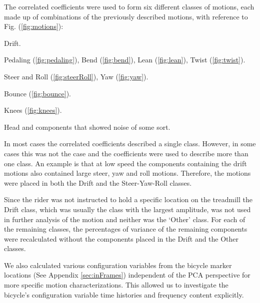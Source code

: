 The correlated coefficients were used to form six different classes of motions,
each made up of combinations of the previously described motions, with
reference to Fig. (\ref{fig:motions}):
\begin{description}
    \item[Drift] Drift.
    \item[Pedaling] Pedaling (\ref{fig:pedaling}), Bend (\ref{fig:bend}), Lean
        (\ref{fig:lean}), Twist (\ref{fig:twist}).
    \item[Steer-Yaw-Roll] Steer and Roll (\ref{fig:steerRoll}), Yaw
        (\ref{fig:yaw}).
    \item[Bounce] Bounce (\ref{fig:bounce}).
    \item[Knees] Knees (\ref{fig:knees}).
    \item[Others] Head and components that showed noise of some
    sort.
\end{description}
In most cases the correlated coefficients described a single class. However, in
some cases this was not the case and the coefficients were used to describe
more than one class. An example is that at low speed the components containing
the drift motions also contained large steer, yaw and roll motions. Therefore,
the motions were placed in both the Drift and the Steer-Yaw-Roll classes.

Since the rider was not instructed to hold a specific location on the treadmill
the Drift class, which was usually the class with the largest amplitude, was
not used in further analysis of the motion and neither was the `Other' class.
For each of the remaining classes, the percentages of variance of the remaining
components were recalculated without the components placed in the Drift and the
Other classes.

We also calculated various configuration variables from the bicycle marker locations
(See Appendix \ref{sec:inFrames}) independent of the PCA perspective for more
specific motion characterizations. This allowed us to investigate the bicycle's
configuration variable time histories and frequency content explicitly.
